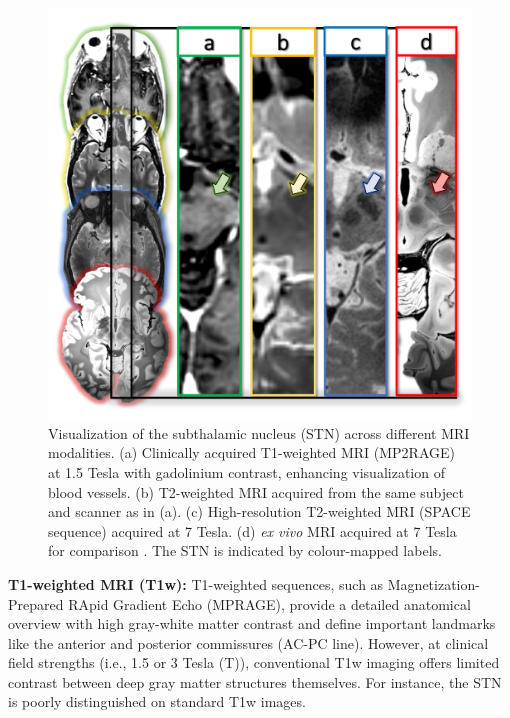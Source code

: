 \begin{figure}[hbt!]
    \centering
    \includegraphics[width=1\linewidth]{figs/ch1_Figure_STN_MRI.png}
    \caption{
    Visualization of the subthalamic nucleus (STN) across different MRI modalities. (a) Clinically acquired T1-weighted MRI (MP2RAGE) at 1.5 Tesla with gadolinium contrast, enhancing visualization of blood vessels. (b) T2-weighted MRI acquired from the same subject and scanner as in (a). (c) High-resolution T2-weighted MRI (SPACE sequence) acquired at 7 Tesla. (d) \textit{ex vivo} MRI acquired at 7 Tesla for comparison \cite{Edlow2020-mo}. The STN is indicated by colour-mapped labels.}
    \label{fig:ch1_Figure_STN_MRI}
\end{figure}

\textbf{T1-weighted MRI (T1w):} T1-weighted sequences, such as Magnetization-Prepared RApid Gradient Echo (MPRAGE), provide a detailed anatomical overview with high gray-white matter contrast \cite{Brant-Zawadzki1992-nw} and define important landmarks like the anterior and posterior commissures (AC-PC line). However, at clinical field strengths (i.e., 1.5 or 3 Tesla (T)), conventional T1w imaging offers limited contrast between deep gray matter structures themselves. For instance, the STN is poorly distinguished on standard T1w images.

